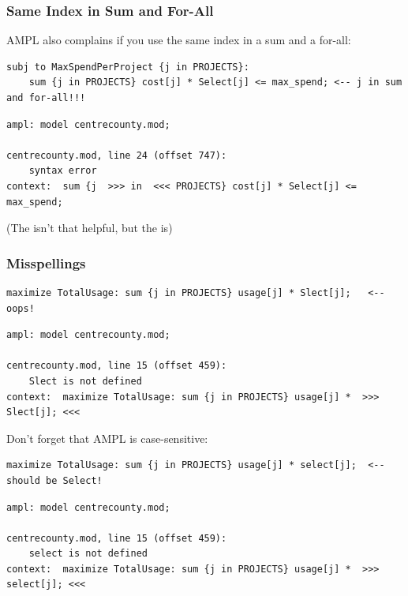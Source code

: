 \begin{frame}[fragile]

	\frametitle{Same Index in Sum and For-All}
	
	\bit
	\item AMPL also complains if you use the same index in a sum and a for-all:
	\eit
	
\begin{lstlisting}
subj to MaxSpendPerProject {j in PROJECTS}: 
	sum {j in PROJECTS} cost[j] * Select[j] <= max_spend; <-- j in sum and for-all!!!
\end{lstlisting}


\begin{lstlisting}
ampl: model centrecounty.mod;

centrecounty.mod, line 24 (offset 747):
	syntax error
context:  sum {j  >>> in  <<< PROJECTS} cost[j] * Select[j] <= max_spend;
\end{lstlisting}

	\bit
	\item (The  isn't that helpful, but the  is)
	\eit

\end{frame}


\begin{frame}[fragile]

	\frametitle{Misspellings}
	
\begin{lstlisting}
maximize TotalUsage: sum {j in PROJECTS} usage[j] * Slect[j];	<-- oops!
\end{lstlisting}


\begin{lstlisting}
ampl: model centrecounty.mod;

centrecounty.mod, line 15 (offset 459):
	Slect is not defined
context:  maximize TotalUsage: sum {j in PROJECTS} usage[j] *  >>> Slect[j]; <<< 
\end{lstlisting}

	\pause 
	
	\bit
	\item Don't forget that AMPL is case-sensitive:
	\eit
	
\begin{lstlisting}
maximize TotalUsage: sum {j in PROJECTS} usage[j] * select[j];	<-- should be Select!
\end{lstlisting}


\begin{lstlisting}
ampl: model centrecounty.mod;

centrecounty.mod, line 15 (offset 459):
	select is not defined
context:  maximize TotalUsage: sum {j in PROJECTS} usage[j] *  >>> select[j]; <<< 
\end{lstlisting}

\end{frame}


